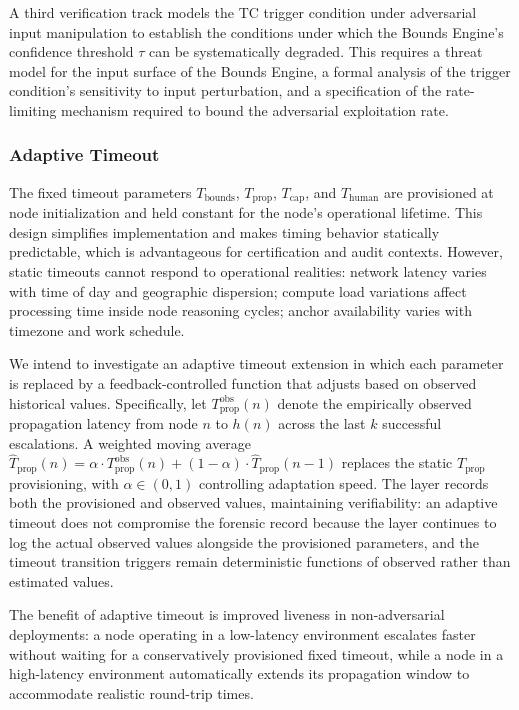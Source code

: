 A third verification track models the TC trigger condition under adversarial input manipulation to establish the conditions under which the Bounds Engine's confidence threshold $\tau$ can be systematically degraded. This requires a threat model for the input surface of the Bounds Engine, a formal analysis of the trigger condition's sensitivity to input perturbation, and a specification of the rate-limiting mechanism required to bound the adversarial exploitation rate.

\subsubsection{Adaptive Timeout}
\label{sec:fw:adaptive-timeout}

The fixed timeout parameters $T_{\text{bounds}}$, $T_{\text{prop}}$, $T_{\text{cap}}$, and $T_{\text{human}}$ are provisioned at node initialization and held constant for the node's operational lifetime. This design simplifies implementation and makes timing behavior statically predictable, which is advantageous for certification and audit contexts. However, static timeouts cannot respond to operational realities: network latency varies with time of day and geographic dispersion; compute load variations affect processing time inside node reasoning cycles; anchor availability varies with timezone and work schedule.

We intend to investigate an adaptive timeout extension in which each parameter is replaced by a feedback-controlled function that adjusts based on observed historical values. Specifically, let $T_{\text{prop}}^{\text{obs}}(n)$ denote the empirically observed propagation latency from node $n$ to $h(n)$ across the last $k$ successful escalations. A weighted moving average $\hat{T}_{\text{prop}}(n) = \alpha \cdot T_{\text{prop}}^{\text{obs}}(n) + (1-\alpha) \cdot \hat{T}_{\text{prop}}(n-1)$ replaces the static $T_{\text{prop}}$ provisioning, with $\alpha \in (0, 1)$ controlling adaptation speed. The \fact{} layer records both the provisioned and observed values, maintaining verifiability: an adaptive timeout does not compromise the forensic record because the \fact{} layer continues to log the actual observed values alongside the provisioned parameters, and the timeout transition triggers remain deterministic functions of observed rather than estimated values.

The benefit of adaptive timeout is improved liveness in non-adversarial deployments: a node operating in a low-latency environment escalates faster without waiting for a conservatively provisioned fixed timeout, while a node in a high-latency environment automatically extends its propagation window to accommodate realistic round-trip times.

